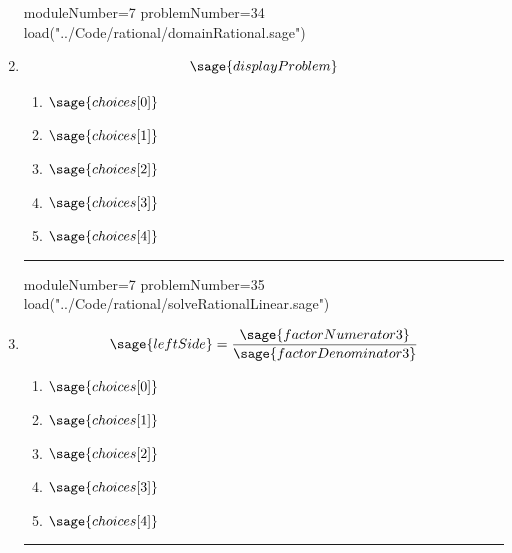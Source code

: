 \documentclass[14pt]{article}
\newcommand{\litem}[1]{\item#1\hspace*{-1cm}\rule{\textwidth}{0.4pt}}
\begin{document}
\begin{enumerate}
\begin{sagesilent}
moduleNumber=7
problemNumber=34
load("../Code/rational/domainRational.sage")
\end{sagesilent}

\litem{ 

\[ \sage{displayProblem} \]

	\begin{enumerate}[label=\Alph*.]
		\item \( \sage{choices[0]} \)
		\item \( \sage{choices[1]} \)
		\item \( \sage{choices[2]} \)
		\item \( \sage{choices[3]} \)
		\item \( \sage{choices[4]} \)
	\end{enumerate}
}

\begin{sagesilent}
moduleNumber=7
problemNumber=35
load("../Code/rational/solveRationalLinear.sage")
\end{sagesilent}

\litem{ 

	\[ \sage{leftSide} = \frac{\sage{factorNumerator3}}{\sage{factorDenominator3}}  \]

	\begin{enumerate}[label=\Alph*.]
    \item \( \sage{choices[0]} \)
    \item \( \sage{choices[1]} \)
    \item \( \sage{choices[2]} \)
    \item \( \sage{choices[3]} \)
    \item \( \sage{choices[4]} \)
	\end{enumerate}
}

\end{enumerate}
\end{document}
